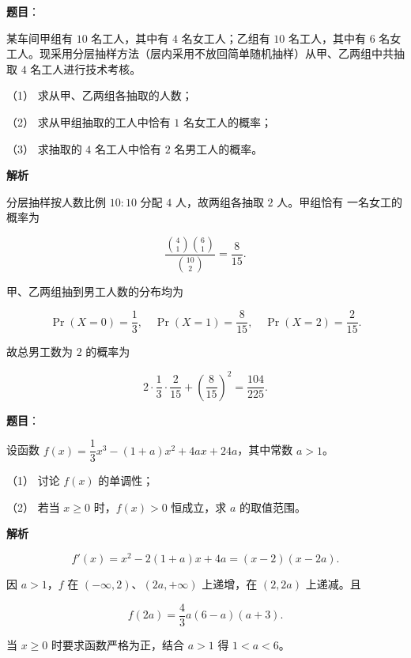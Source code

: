\begin{answer}

\textbf{题目}：

某车间甲组有 $10$ 名工人，其中有 $4$ 名女工人；乙组有 $10$ 名工人，其中有 $6$ 名女工人。现采用分层抽样方法（层内采用不放回简单随机抽样）从甲、乙两组中共抽取 $4$ 名工人进行技术考核。

（1） 求从甲、乙两组各抽取的人数；

（2） 求从甲组抽取的工人中恰有 $1$ 名女工人的概率；

（3） 求抽取的 $4$ 名工人中恰有 $2$ 名男工人的概率。

\textbf{解析}


分层抽样按人数比例 $10:10$ 分配 $4$ 人，故两组各抽取 $2$ 人。甲组恰有
一名女工的概率为

\nopagebreak[4]
\[
\frac{\binom41\binom61}{\binom{10}{2}}=\frac8{15}.
\]


甲、乙两组抽到男工人数的分布均为

\nopagebreak[4]
\[
\Pr(X=0)=\frac13,\quad
\Pr(X=1)=\frac8{15},\quad
\Pr(X=2)=\frac2{15}.
\]


故总男工数为 $2$ 的概率为

\nopagebreak[4]
\[
2\cdot\frac13\cdot\frac2{15}
+\left(\frac8{15}\right)^2
=\frac{104}{225}.
\]




\end{answer}
\begin{answer}

\textbf{题目}：

设函数 $f(x)=\dfrac13x^3-(1+a)x^2+4ax+24a$，其中常数 $a>1$。

（1） 讨论 $f(x)$ 的单调性；

（2） 若当 $x\geqslant0$ 时，$f(x)>0$ 恒成立，求 $a$ 的取值范围。

\textbf{解析}


\nopagebreak[4]
\[
f'(x)=x^2-2(1+a)x+4a=(x-2)(x-2a).
\]

因 $a>1$，$f$ 在 $(-\infty,2)$、$(2a,+\infty)$ 上递增，在
$(2,2a)$ 上递减。且

\nopagebreak[4]
\[
f(2a)=\frac43a(6-a)(a+3).
\]


当 $x\geqslant0$ 时要求函数严格为正，结合 $a>1$ 得
$1<a<6$。



\end{answer}
